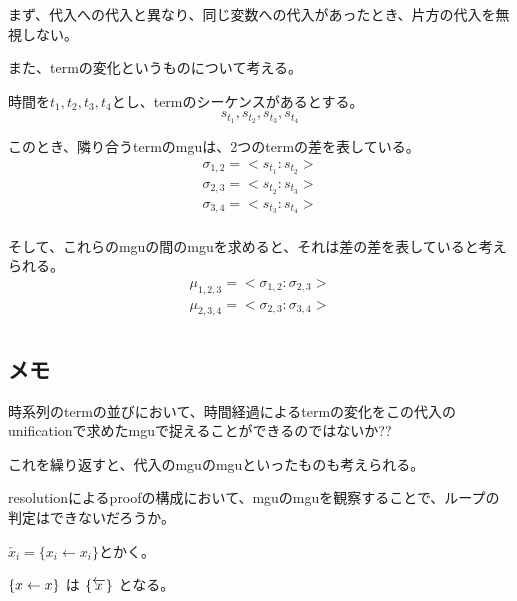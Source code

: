 \documentclass[10pt, oneside]{jarticle}   	%
\begin{document}
まず、代入への代入と異なり、同じ変数への代入があったとき、片方の代入を無視しない。

また、termの変化というものについて考える。

時間を$t_1,t_2,t_3,t_4$とし、termのシーケンスがあるとする。
$$s_{t_1}, s_{t_2}, s_{t_3}, s_{t_4}$$

 このとき、隣り合うtermのmguは、2つのtermの差を表している。
\begin{eqnarray*}
 \sigma_{1,2} = <s_{t_1}:s_{t_2}>\\
 \sigma_{2,3}= <s_{t_2}:s_{t_3}>\\
 \sigma_{3,4}= <s_{t_3}:s_{t_4}>\\
\end{eqnarray*}

そして、これらのmguの間のmguを求めると、それは差の差を表していると考えられる。
\begin{eqnarray*}
 \mu_{1,2,3} = <\sigma_{1,2}:\sigma_{2,3}>\\
 \mu_{2,3,4} = <\sigma_{2,3}:\sigma_{3,4}>\\ 
\end{eqnarray*}

\subsection{メモ}
時系列のtermの並びにおいて、時間経過によるtermの変化をこの代入のunificationで求めたmguで捉えることができるのではないか??

これを繰り返すと、代入のmguのmguといったものも考えられる。

resolutionによるproofの構成において、mguのmguを観察することで、ループの判定はできないだろうか。

 $\overleftarrow{x_i} = \{x_i \leftarrow x_i\}$とかく。

$\{{x \leftarrow x}\}$ 
は
$\{{\overleftarrow{x}}\}$
となる。
\end{document}
